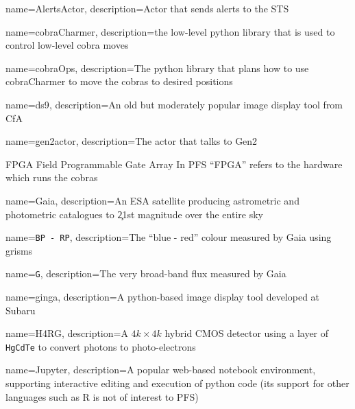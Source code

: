 %
%
%
%
%
{
  name={AlertsActor},
  description={Actor that sends alerts to the STS}
}



{
  name={cobraCharmer},
  description={the low-level python library that is used to control low-level cobra moves}
}

{
  name={cobraOps},
  description={The python library that plans how to use \gls{cobraCharmer} to move
  the cobras to desired positions}
}

{
  name={ds9},
  description={An old but moderately popular image display tool from CfA}
}

{
  name={gen2actor},
  description={The \MHS actor that talks to \gls{Gen2}}
}

{FPGA}
{Field Programmable Gate Array}
{In PFS ``FPGA'' refers to the hardware which runs the cobras}


{
  name={Gaia},
  description={An ESA satellite producing astrometric and photometric catalogues to \c 21st
  magnitude over the entire sky}
}

{
  name={\texttt{BP - RP}},
  description={The ``blue - red'' colour measured by \gls{Gaia} using grisms}
}

{
  name={\texttt{G}},
  description={The very broad-band flux measured by \gls{Gaia}}
}

{
  name={ginga},
  description={A python-based image display tool developed at Subaru}
}

{
   name={H4RG},
   description={A $4k\times 4k$ hybrid CMOS detector using a layer of \texttt{HgCdTe} to convert photons
   to photo-electrons}
}


{
  name={Jupyter},
  description={A popular web-based notebook environment, supporting interactive editing
    and execution of python code (its support for other languages such as R is not of interest to PFS)}
}

